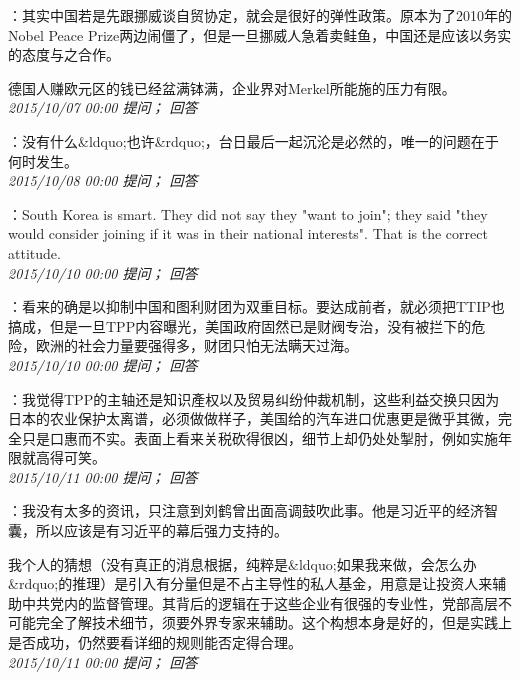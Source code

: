 \documentclass[twocolumn]{ctexart}
\begin{document}
：其实中国若是先跟挪威谈自贸协定，就会是很好的弹性政策。原本为了2010年的Nobel Peace Prize两边闹僵了，但是一旦挪威人急着卖鲑鱼，中国还是应该以务实的态度与之合作。

德国人赚欧元区的钱已经盆满钵满，企业界对Merkel所能施的压力有限。\\

\textit{\hfill\noindent\small 2015/10/07 00:00 提问； 回答}

：没有什么\&ldquo;也许\&rdquo;，台日最后一起沉沦是必然的，唯一的问题在于何时发生。\\

\textit{\hfill\noindent\small 2015/10/08 00:00 提问； 回答}

：South Korea is smart. They did not say they "want to join"; they said "they would consider joining if it was in their national interests". That is the correct attitude.\\

\textit{\hfill\noindent\small 2015/10/10 00:00 提问； 回答}

：看来的确是以抑制中国和图利财团为双重目标。要达成前者，就必须把TTIP也搞成，但是一旦TPP内容曝光，美国政府固然已是财阀专治，没有被拦下的危险，欧洲的社会力量要强得多，财团只怕无法瞒天过海。\\

\textit{\hfill\noindent\small 2015/10/10 00:00 提问； 回答}

：我觉得TPP的主轴还是知识產权以及贸易纠纷仲裁机制，这些利益交换只因为日本的农业保护太离谱，必须做做样子，美国给的汽车进口优惠更是微乎其微，完全只是口惠而不实。表面上看来关税砍得很凶，细节上却仍处处掣肘，例如实施年限就高得可笑。\\

\textit{\hfill\noindent\small 2015/10/11 00:00 提问； 回答}

：我没有太多的资讯，只注意到刘鹤曾出面高调鼓吹此事。他是习近平的经济智囊，所以应该是有习近平的幕后强力支持的。

我个人的猜想（没有真正的消息根据，纯粹是\&ldquo;如果我来做，会怎么办\&rdquo;的推理）是引入有分量但是不占主导性的私人基金，用意是让投资人来辅助中共党内的监督管理。其背后的逻辑在于这些企业有很强的专业性，党部高层不可能完全了解技术细节，须要外界专家来辅助。这个构想本身是好的，但是实践上是否成功，仍然要看详细的规则能否定得合理。\\

\textit{\hfill\noindent\small 2015/10/11 00:00 提问； 回答}
\end{document}
